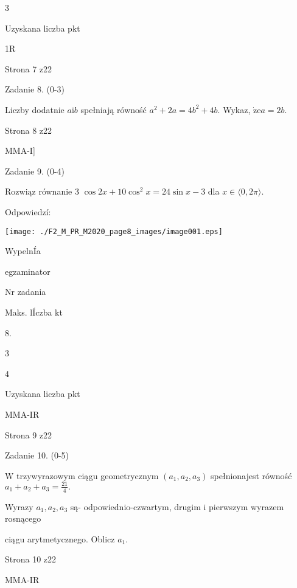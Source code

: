 \documentclass[a4paper,12pt]{article}
\begin{document}
3

Uzyskana liczba pkt

1R

Strona 7 z22





Zadanie 8. (0-3)

Liczby dodatnie $a\mathrm{i}b$ spełniają równość $a^{2}+2a=4b^{2}+4b$. Wykaz, $\dot{\mathrm{z}}\mathrm{e}a=2b.$

Strona 8 z22

MMA-I]





Zadanie 9. (0-4)

Rozwiąz równanie 3 $\cos 2x+10\cos^{2}x=24\sin x-3$ dla $x\in\langle 0, 2\pi\rangle.$

Odpowiedzí:
\begin{center}
\texttt{[image: ./F2\_M\_PR\_M2020\_page8\_images/image001.eps]}
\end{center}
WypelnÍa

egzaminator

Nr zadania

Maks. lÍczba kt

8.

3

4

Uzyskana liczba pkt

MMA-IR

Strona 9 z22





Zadanie 10. (0-5)

$\mathrm{W}$ trzywyrazowym ciągu geometrycznym $(a_{1},a_{2},a_{3})$ spełnionajest równość $a_{1}+a_{2}+a_{3}=\displaystyle \frac{21}{4}.$

Wyrazy $a_{1}, a_{2}, a_{3}$ są- odpowiednio-czwartym, drugim i pierwszym wyrazem rosnącego

ciągu arytmetycznego. Oblicz $a_{1}.$

Strona 10 z22

MMA-IR
\end{document}
